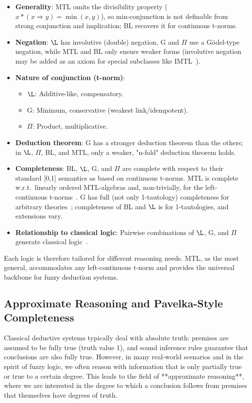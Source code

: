 \begin{itemize}
    \item \textbf{Generality}: MTL omits the divisibility property ($x*(x \Rightarrow y)=\min(x,y)$), so min-conjunction is not definable from strong conjunction and implication; BL recovers it for continuous t-norms.
    \item \textbf{Negation}: $\L$ has involutive (double) negation, G and $\Pi$ use a Gödel-type negation, while MTL and BL only ensure weaker forms (involutive negation may be added as an axiom for special subclasses like IMTL~\cite{GodoMonoidal}).
    \item \textbf{Nature of conjunction (t-norm)}:
        \begin{itemize}
            \item $\L$: Additive-like, compensatory.
            \item G: Minimum, conservative (weakest link/idempotent).
            \item $\Pi$: Product, multiplicative.
        \end{itemize}
    \item \textbf{Deduction theorem}: G has a stronger deduction theorem than the others; in $\L$, $\Pi$, BL, and MTL, only a weaker, "n-fold" deduction theorem holds.
    \item \textbf{Completeness}: BL, $\L$, G, and $\Pi$ are complete with respect to their standard [0,1] semantics as based on continuous t-norms. MTL is complete w.r.t.\ linearly ordered MTL-algebras and, non-trivially, for the left-continuous t-norms~\cite{Jenei2001MTLCompl}. G has full (not only 1-tautology) completeness for arbitrary theories~\cite[Thm. 4.2.17]{Hajek1998}; completeness of BL and $\L$ is for 1-tautologies, and extensions vary.
    \item \textbf{Relationship to classical logic}: Pairwise combinations of $\L$, G, and $\Pi$ generate classical logic~\cite[Thm. 4.3.9]{Hajek1998}.
\end{itemize}
Each logic is therefore tailored for different reasoning needs. MTL, as the most general, accommodates any left-continuous t-norm and provides the universal backbone for fuzzy deduction systems.

\subsection{Approximate Reasoning and Pavelka-Style Completeness}

Classical deductive systems typically deal with absolute truth: premises are assumed to be fully true (truth value 1), and sound inference rules guarantee that conclusions are also fully true. However, in many real-world scenarios and in the spirit of fuzzy logic, we often reason with information that is only partially true or true to a certain degree. This leads to the field of **approximate reasoning**, where we are interested in the degree to which a conclusion follows from premises that themselves have degrees of truth.

